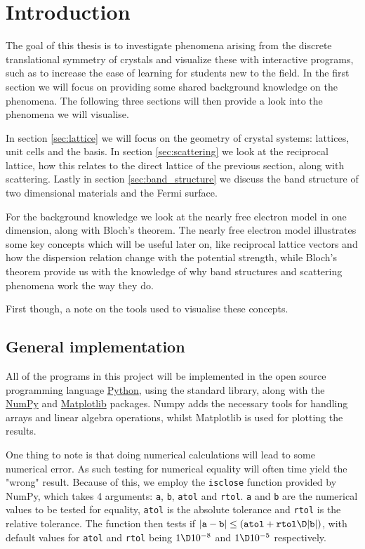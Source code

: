 \documentclass[main.tex]{subfiles}
\begin{document}
	\section{Introduction}
	The goal of this thesis is to investigate phenomena arising from the discrete translational symmetry of crystals and visualize these with interactive programs, such as to increase the ease of learning for students new to the field. In the first section we will focus on providing some shared background knowledge on the phenomena. The following three sections will then provide a look into the phenomena we will visualise.
	
	In section \ref{sec:lattice} we will focus on the geometry of crystal systems: lattices, unit cells and the basis. In section \ref{sec:scattering} we look at the reciprocal lattice, how this relates to the direct lattice of the previous section, along with scattering. Lastly in section \ref{sec:band_structure} we discuss the band structure of two dimensional materials and the Fermi surface.
	
	For the background knowledge we look at the nearly free electron model in one dimension, along with Bloch's theorem. The nearly free electron model illustrates some key concepts which will be useful later on, like reciprocal lattice vectors and how the dispersion relation change with the potential strength, while Bloch's theorem provide us with the knowledge of why band structures and scattering phenomena work the way they do.
	
	First though, a note on the tools used to visualise these concepts.

	\subsection{General implementation}
	All of the programs in this project will be implemented in the open source programming language \href{www.python.org}{Python}, using the standard library, along with the \href{www.numpy.org}{NumPy} and \href{www.matplotlib.org}{Matplotlib} packages. Numpy adds the necessary tools for handling arrays and linear algebra operations, whilst Matplotlib is used for plotting the results.
	
	One thing to note is that doing numerical calculations will lead to some numerical error. As such testing for numerical equality will often time yield the "wrong" result. Because of this, we employ the \texttt{isclose} function provided by NumPy, which takes 4 arguments: \texttt{a}, \texttt{b}, \texttt{atol} and \texttt{rtol}. \texttt{a} and \texttt{b} are the numerical values to be tested for equality, \texttt{atol} is the absolute tolerance and \texttt{rtol} is the relative tolerance. The function then tests if $|\texttt{a}-\texttt{b}| \leq (\texttt{atol}+ \texttt{rtol} \D |\texttt{b}|)$, with default values for \texttt{atol} and \texttt{rtol} being $ 1 \D 10^{-8} $ and $ 1 \D 10^{-5} $ respectively.
	
\end{document}
